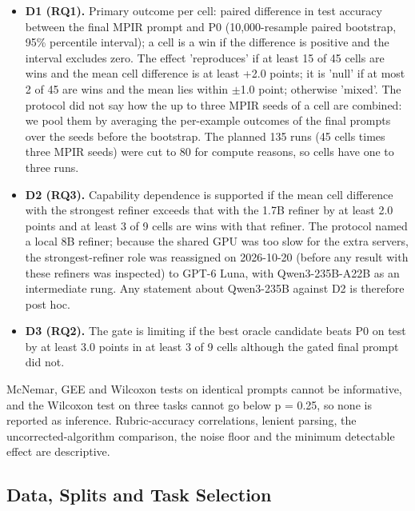 \documentclass{ieeeaccess}
\begin{document}
\begin{itemize}
\item \textbf{D1 (RQ1).} Primary outcome per cell: paired difference in test accuracy between the final MPIR prompt and P0 (10,000-resample paired bootstrap, 95\% percentile interval); a cell is a win if the difference is positive and the interval excludes zero. The effect 'reproduces' if at least 15 of 45 cells are wins and the mean cell difference is at least +2.0 points; it is 'null' if at most 2 of 45 are wins and the mean lies within $\pm$1.0 point; otherwise 'mixed'. The protocol did not say how the up to three MPIR seeds of a cell are combined: we pool them by averaging the per-example outcomes of the final prompts over the seeds before the bootstrap. The planned 135 runs (45 cells times three MPIR seeds) were cut to 80 for compute reasons, so cells have one to three runs.
\item \textbf{D2 (RQ3).} Capability dependence is supported if the mean cell difference with the strongest refiner exceeds that with the 1.7B refiner by at least 2.0 points and at least 3 of 9 cells are wins with that refiner. The protocol named a local 8B refiner; because the shared GPU was too slow for the extra servers, the strongest-refiner role was reassigned on 2026-10-20 (before any result with these refiners was inspected) to GPT-6 Luna, with Qwen3-235B-A22B as an intermediate rung. Any statement about Qwen3-235B against D2 is therefore post hoc.
\item \textbf{D3 (RQ2).} The gate is limiting if the best oracle candidate beats P0 on test by at least 3.0 points in at least 3 of 9 cells although the gated final prompt did not.
\end{itemize}

McNemar, GEE and Wilcoxon tests on identical prompts cannot be informative, and the Wilcoxon test on three tasks cannot go below p = 0.25, so none is reported as inference. Rubric-accuracy correlations, lenient parsing, the uncorrected-algorithm comparison, the noise floor and the minimum detectable effect are descriptive.

\subsection{Data, Splits and Task Selection}
\end{document}
